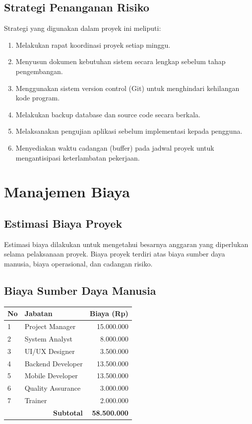 \documentclass[12pt,a4paper]{article}
\begin{document}
\subsection{Strategi Penanganan Risiko}

Strategi yang digunakan dalam proyek ini meliputi:

\begin{enumerate}
\item Melakukan rapat koordinasi proyek setiap minggu.
\item Menyusun dokumen kebutuhan sistem secara lengkap sebelum tahap pengembangan.
\item Menggunakan sistem version control (Git) untuk menghindari kehilangan kode program.
\item Melakukan backup database dan source code secara berkala.
\item Melaksanakan pengujian aplikasi sebelum implementasi kepada pengguna.
\item Menyediakan waktu cadangan (buffer) pada jadwal proyek untuk mengantisipasi keterlambatan pekerjaan.
\end{enumerate}


\section{Manajemen Biaya}

\subsection{Estimasi Biaya Proyek}

Estimasi biaya dilakukan untuk mengetahui besarnya anggaran yang diperlukan selama pelaksanaan proyek. Biaya proyek terdiri atas biaya sumber daya manusia, biaya operasional, dan cadangan risiko.

\subsection{Biaya Sumber Daya Manusia}

\begin{table}[H]
\centering
\begin{tabular}{p{0.8cm}p{4cm}r}
\toprule
\textbf{No} & \textbf{Jabatan} & \textbf{Biaya (Rp)}\\
\midrule
1 & Project Manager & 15.000.000\\
2 & System Analyst & 8.000.000\\
3 & UI/UX Designer & 3.500.000\\
4 & Backend Developer & 13.500.000\\
5 & Mobile Developer & 13.500.000\\
6 & Quality Assurance & 3.000.000\\
7 & Trainer & 2.000.000\\
\midrule
\multicolumn{2}{r}{\textbf{Subtotal}} & \textbf{58.500.000}\\
\bottomrule
\end{tabular}
\end{table}
\end{document}
